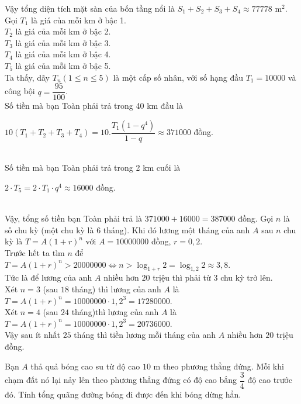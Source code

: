 \begin{ex}
{\begin{itemchoice}
   Vậy tổng diện  tích mặt sàn của bốn tầng nổi là $S_1+S_2+S_3+S_4\approx 77778$ m$^2$.
   \itemch Gọi $T_1$ là giá của mỗi km ở  bậc 1.\\
   $T_2$  là giá của mỗi km ở bậc 2.\\
   $T_3$ là giá của  mỗi km ở bậc 3.\\
   $T_4$ là giá  của mỗi km ở bậc 4.\\
   $T_5$ là giá của mỗi km ở bậc 5.\\ 
   Ta thấy, dãy $T_n (1 \le n \le 5)$ là một cấp số nhân, với  số hạng đầu $T_1=10000$ và công bội $q=\dfrac{95}{100}$.\\
    Số tiền mà bạn Toàn phải trả trong 40 km đầu là \\
   \centerline{$10(T_1+T_2+T_3+T_4)=10.\dfrac{T_1(1-q^4)}{1-q}\approx 371000$  đồng.}\\
   Số tiền mà bạn Toàn phải trả trong 2 km  cuối là \\
   \centerline{$2\cdot T_5=2\cdot T_1\cdot q^4 \approx  16000$ đồng.}\\
   Vậy, tổng  số tiền bạn Toàn phải trả là $371000+16000=387000$ đồng.
   \itemch Gọi $n$ là số chu kỳ (một chu kỳ là $6$ tháng). Khi đó lương một  tháng của anh $A$ sau $n$ chu kỳ là $T=A(1+r)^n$ với $A=10000000$ đồng, $r=0,2$.\\
   Trước hết ta tìm $n$ để $T=A(1+r)^n>20000000 \Leftrightarrow n>\log_{1+r}2=\log_{1,2}2 \approx  3,8$.\\
    Tức là để lương của anh $A$ nhiều hơn $20$ trịệu thì phải từ $3$ chu kỳ trở lên. \\
   Xét $n=3$ (sau $18$  tháng) thì lương của anh $A$ là $T=A(1+r)^n=10000000 \cdot 1,2^3=17280000$.\\
   Xét $n=4$ (sau $24$ tháng)thì lương của anh $A$ là $ T=A(1+r)^n=10000000  \cdot 1,2^3=20736000$.\\
    Vậy sau ít nhất $25$ tháng thì tiền lương mỗi tháng của anh $A$ nhiều hơn $20$ trịệu đồng.
  \end{itemchoice}
 } 
\end{ex}



\begin{ex}%
	Bạn $A$ thả quả bóng cao su  từ độ cao $10$ m theo phương thẳng đứng. Mỗi khi chạm đất nó lại nảy lên theo phương thẳng đứng có độ cao bẳng $\dfrac{3}{4}$ độ cao trước đó. Tính tổng quãng đường bóng đi được đến khi bóng dừng hẳn.
\end{ex}

